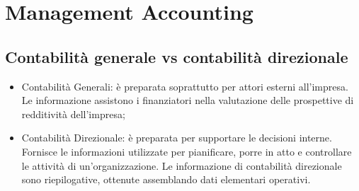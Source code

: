 \documentclass{article}
\begin{document}
\section{Management Accounting}
\subsection{Contabilità generale vs contabilità direzionale}
\begin{itemize}
    \item Contabilità Generali: è preparata soprattutto per attori
    esterni all'impresa. Le informazione assistono i finanziatori
    nella valutazione delle prospettive di redditività dell'impresa;
    \item Contabilità Direzionale: è preparata per supportare le
    decisioni interne. Fornisce le informazioni utilizzate per
    pianificare, porre in atto e controllare le attività di
    un'organizzazione. Le informazione di contabilità direzionale
    sono riepilogative, ottenute assemblando dati elementari
    operativi.
\end{itemize}
\end{document}
